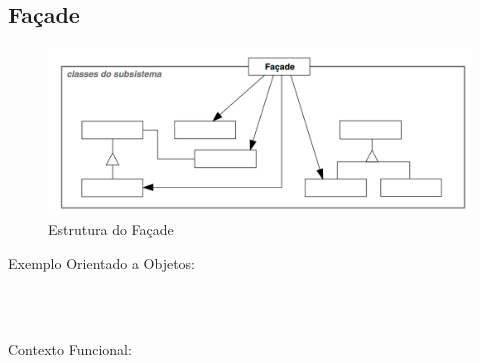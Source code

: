\subsection{Façade}



\begin{figure}[htb]
	\caption{\label{fig_grafico}Estrutura do Façade}
	\begin{center}
	    \includegraphics[scale=0.42]{5_padroes-contexto-funcional/5.2_estruturais/5.2.5_facade/diagram.png}
	\end{center}
\end{figure}

Exemplo Orientado a Objetos:

\begin{lstlisting}[caption={Façade Orientado a Objetos},label=oofacade]



\end{lstlisting}

Contexto Funcional:


\begin{lstlisting}[caption={Façade Funcional},label=fpfacade]
    

    
\end{lstlisting}